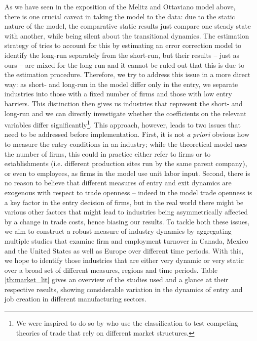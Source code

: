 \documentclass[a4paper,12pt]{article}
\begin{document}
As we have seen in the exposition of the Melitz and Ottaviano model above, there is one crucial caveat in taking the model to the data: due to the static nature of the model, the comparative static results just compare one steady state with another, while being silent about the transitional dynamics. The estimation strategy of \citet{Chen2009} tries to account for this by estimating an error correction model to identify the long-run separately from the short-run, but their results -- just as ours -- are mixed for the long run and it cannot be ruled out that this is due to the estimation procedure. Therefore, we try to address this issue in a more direct way: as short- and long-run in the model differ only in the entry, we separate industries into those with a fixed number of firms and those with low entry barriers. This distinction then gives us industries that represent the short- and long-run and we can directly investigate whether the coefficients on the relevant variables differ significantly\footnote{We were inspired to do so by \citet{Head1999} who use the classification to test competing theories of trade that rely on different market structures.}. This approach, however, leads to two issues that need to be addressed before implementation. First, it is not \textit{a priori} obvious how to measure the entry conditions in an industry; while the theoretical model uses the number of firms, this could in practice either refer to firms or to establishments (i.e. different production sites run by the same parent company), or even to employees, as firms in the model use unit labor input. Second, there is no reason to believe that different measures of entry and exit dynamics are exogenous with respect to trade openness -- indeed in the model trade openness is a key factor in the entry decision of firms, but in the real world there might be various other factors that might lead to industries being asymmetrically affected by a change in trade costs, hence biasing our results. To tackle both these issues, we aim to construct a robust measure of industry dynamics by aggregating multiple studies that examine firm and employment turnover in Canada, Mexico and the United States as well as Europe over different time periods. With this, we hope to identify those industries that are either very dynamic or very static over a broad set of different measures, regions and time periods. Table \ref{tb:market_lit} gives an overview of the studies used and a glance at their respective results, showing considerable variation in the dynamics of entry and job creation in different manufacturing sectors.
 
\end{document}
